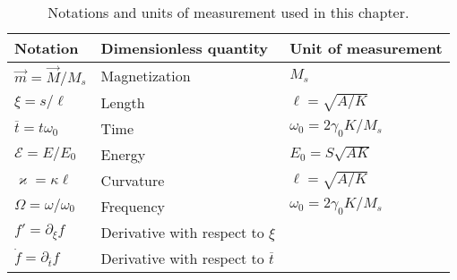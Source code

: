 \begin{table}[h!]
	\begin{tabular}{p{}p{}p{}}
		\hline\hline
		Notation & Dimensionless quantity & Unit of measurement \\
		\hline
		$\vec{m}=\vec{M}/M_s$ & Magnetization & $M_s$\\
		$\xi = s /\ell$ & Length & $\ell = \sqrt{A/K}$\\
		$\overline{t} = t\omega_0$ & Time & $\omega_0 =2 \gamma_0 K / M_s$\\
		$\mathcal{E}=E/E_0$ & Energy & $E_0=S\sqrt{AK}$\\
		$\varkappa = \kappa \ell$ & Curvature & $\ell = \sqrt{A/K}$\\
		$\Omega = \omega/ \omega_0$ & Frequency & $\omega_0 =2 \gamma_0 K / M_s$\\
		$f' = \partial_\xi f$ & Derivative with respect to $\xi$ &\\
		$\dot{f}= \partial_{\overline{t}} f$ & Derivative with respect to $\overline{t}$ & \\
		\hline\hline
	\end{tabular} 
	\caption{\label{tab:notation} Notations and units of measurement used in this chapter.}
\end{table}
